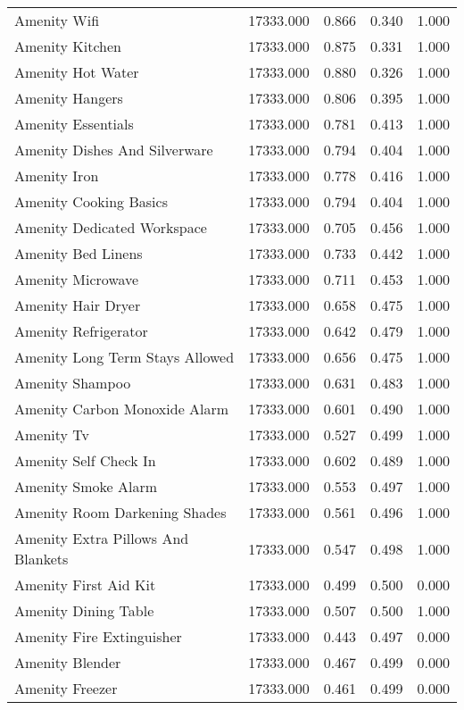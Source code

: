 \begin{tabular}{lllll}
Amenity Wifi & 17333.000 & 0.866 & 0.340 & 1.000 \\
Amenity Kitchen & 17333.000 & 0.875 & 0.331 & 1.000 \\
Amenity Hot Water & 17333.000 & 0.880 & 0.326 & 1.000 \\
Amenity Hangers & 17333.000 & 0.806 & 0.395 & 1.000 \\
Amenity Essentials & 17333.000 & 0.781 & 0.413 & 1.000 \\
Amenity Dishes And Silverware & 17333.000 & 0.794 & 0.404 & 1.000 \\
Amenity Iron & 17333.000 & 0.778 & 0.416 & 1.000 \\
Amenity Cooking Basics & 17333.000 & 0.794 & 0.404 & 1.000 \\
Amenity Dedicated Workspace & 17333.000 & 0.705 & 0.456 & 1.000 \\
Amenity Bed Linens & 17333.000 & 0.733 & 0.442 & 1.000 \\
Amenity Microwave & 17333.000 & 0.711 & 0.453 & 1.000 \\
Amenity Hair Dryer & 17333.000 & 0.658 & 0.475 & 1.000 \\
Amenity Refrigerator & 17333.000 & 0.642 & 0.479 & 1.000 \\
Amenity Long Term Stays Allowed & 17333.000 & 0.656 & 0.475 & 1.000 \\
Amenity Shampoo & 17333.000 & 0.631 & 0.483 & 1.000 \\
Amenity Carbon Monoxide Alarm & 17333.000 & 0.601 & 0.490 & 1.000 \\
Amenity Tv & 17333.000 & 0.527 & 0.499 & 1.000 \\
Amenity Self Check In & 17333.000 & 0.602 & 0.489 & 1.000 \\
Amenity Smoke Alarm & 17333.000 & 0.553 & 0.497 & 1.000 \\
Amenity Room Darkening Shades & 17333.000 & 0.561 & 0.496 & 1.000 \\
Amenity Extra Pillows And Blankets & 17333.000 & 0.547 & 0.498 & 1.000 \\
Amenity First Aid Kit & 17333.000 & 0.499 & 0.500 & 0.000 \\
Amenity Dining Table & 17333.000 & 0.507 & 0.500 & 1.000 \\
Amenity Fire Extinguisher & 17333.000 & 0.443 & 0.497 & 0.000 \\
Amenity Blender & 17333.000 & 0.467 & 0.499 & 0.000 \\
Amenity Freezer & 17333.000 & 0.461 & 0.499 & 0.000 \\

\end{tabular}
